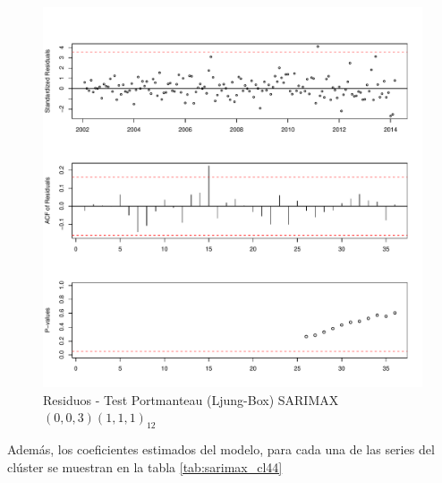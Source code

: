 \documentclass[12pt,oneside]{book}\usepackage[]{graphicx}\usepackage[]{color}
\makeatletter
\def\maxwidth{ %
  \ifdim\Gin@nat@width>\linewidth
    \linewidth
  \else
    \Gin@nat@width
  \fi
}
\newenvironment{knitrout}{}{} %
\theoremstyle{definition} %
\makeatother
\begin{document}
\begin{knitrout}
\color{fgcolor}\begin{figure}[h]

{\centering \includegraphics[width=\maxwidth]{figure/unnamed-chunk-115-1} 

}

\caption[Residuos - Test Portmanteau (Ljung-Box) SARIMAX$(0,0,3)(1,1,1)_{12}$]{Residuos - Test Portmanteau (Ljung-Box) SARIMAX$(0,0,3)(1,1,1)_{12}$}\label{fig:unnamed-chunk-115}
\end{figure}


\end{knitrout}


Además, los coeficientes estimados del modelo, para cada una de las series del clúster se muestran en la tabla \ref{tab:sarimax_cl44}
\end{document}
